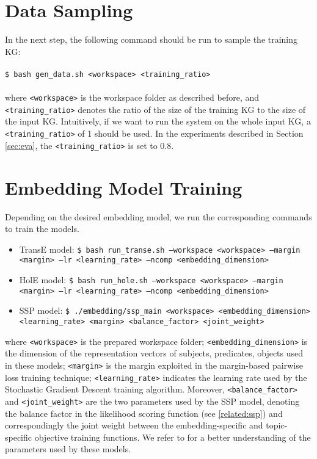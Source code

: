 \section{Data Sampling}
\label{how:sample}
In the next step, the following command should be run to sample the training KG:\\
\\
\texttt{\$ bash gen\_data.sh <workspace> <training\_ratio>}\\
\\
where \texttt{<workspace>} is the workspace folder as described before, and \texttt{<training\_ratio>} denotes the ratio of the size of the training KG to the size of the input KG. Intuitively, if we want to run the system on the whole input KG, a \texttt{<training\_ratio>} of 1 should be used. In the experiments described in Section \ref{sec:eva}, the \texttt{<training\_ratio>} is set to 0.8.
\section{Embedding Model Training}
Depending on the desired embedding model, we run the corresponding commands to train the models.
\begin{itemize}
\item TransE model:\; \texttt{\$ bash run\_transe.sh --workspace <workspace> --margin <margin> --lr <learning\_rate> --ncomp <embedding\_dimension>}
\item HolE model:\; \texttt{\$ bash run\_hole.sh --workspace <workspace> --margin <margin> --lr <learning\_rate> --ncomp <embedding\_dimension>}
\item SSP model:\; \texttt{\$ ./embedding/ssp\_main <workspace> <embedding\_dimension>\\<learning\_rate> <margin> <balance\_factor> <joint\_weight>} 
\end{itemize}
where \texttt{<workspace>} is the prepared workspace folder; \texttt{<embedding\_dimension>} is the dimension of the representation vectors of subjects, predicates, objects used in these models; \texttt{<margin>} is the margin exploited in the margin-based pairwise loss training technique; \texttt{<learning\_rate>} indicates the learning rate used by the Stochastic Gradient Descent training algorithm. Moreover, \texttt{<balance\_factor>} and \texttt{<joint\_weight>} are the two parameters used by the SSP model, denoting the balance factor in the likelihood scoring function (see \ref{related:ssp}) and correspondingly the joint weight between the embedding-specific and topic-specific objective training functions. We refer to \cite{Bordes:NIPS2013,DBLP:conf/aaai/NickelRP16,DBLP:conf/aaai/0005HMZ17} for a better understanding of the parameters used by these models.
